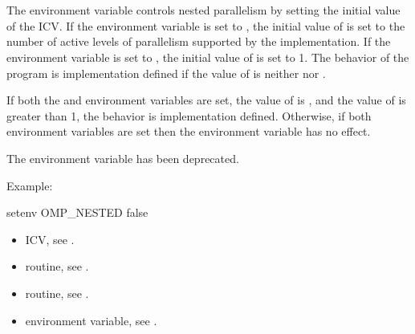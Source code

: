 \section{}
\label{sec:OMP_NESTED}
The  environment variable controls nested parallelism by
setting the initial value of the  ICV. If the
environment variable is set to , the initial value of
 is set to the number of active levels of
parallelism supported by the implementation. If the environment variable is
set to , the initial value of 
is set to 1. The behavior of the program is implementation defined if the
value of  is neither  nor .

If both the  and  environment
variables are set, the value of  is , and
the value of  is greater than 1, the behavior is
implementation defined. Otherwise, if both environment variables are set then
the  environment variable has no effect.

The  environment variable has been deprecated.


Example:
\begin{ompEnv}
setenv OMP_NESTED false
\end{ompEnv}

\crossreferences
\begin{itemize}
\item {} ICV, see .

\item {} routine, see .

\item {} routine, see .

\item {} environment variable, see .
\end{itemize}











